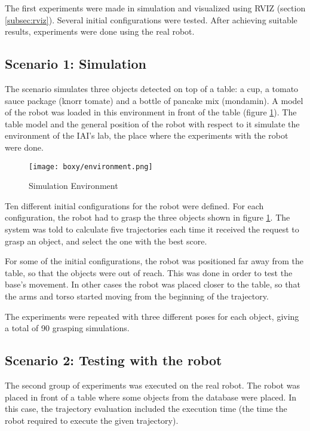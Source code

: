 The first experiments were made in simulation and visualized using RVIZ (section \ref{subsec:rviz}). Several initial configurations were tested. After achieving suitable results, experiments were done using the real robot.


\subsection{Scenario 1: Simulation}
\label{sub:scenario1}

The scenario simulates three objects detected on top of a table: a cup, a tomato sauce package (knorr tomate) and a bottle of pancake mix (mondamin). A model of the robot was loaded in this environment in front of the table (figure \ref{fig:env}). The table model and the general position of the robot with respect to it simulate the environment of the IAI's lab, the place where the experiments with the robot were done.

\begin{figure}[H]
	\centering
	{\texttt{[image: boxy/environment.png]}}
	\vspace{-12pt}
	\caption[Simulation Environment]{Simulation Environment}
	\vspace{-15pt}
	\label{fig:env}
\end{figure}

Ten different initial configurations for the robot were defined. For each configuration, the robot had to grasp the three objects shown in figure \ref{fig:env}. The system was told to calculate five trajectories each time it received the request to grasp an object, and select the one with the best score.

For some of the initial configurations, the robot was positioned far away from the table, so that the objects were out of reach. This was done in order to test the base's movement. In other cases the robot was placed closer to the table, so that the arms and torso started moving from the beginning of the trajectory.

The experiments were repeated with three different poses for each object, giving a total of 90 grasping simulations.

\subsection{Scenario 2: Testing with the robot}

The second group of experiments was executed on the real robot. The robot was placed in front of a table where some objects from the database were placed. In this case, the trajectory evaluation included the execution time (the time the robot required to execute the given trajectory).

